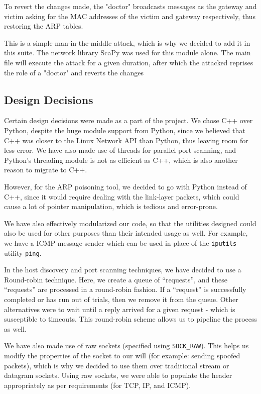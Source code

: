 \documentclass[12pt]{article}
\newcommand{\pbreak}{\vspace{4mm}}
\begin{document}
To revert the changes made, the "doctor" broadcasts messages as the gateway and victim asking for the MAC addresses of the victim and gateway respectively, thus restoring the ARP tables.
\pbreak

This is a simple man-in-the-middle attack, which is why we decided to add it in this suite. The network library ScaPy was used for this module alone. The main file will execute the attack for a given duration, after which the attacked reprises the role of a "doctor" and reverts the changes

\subsection{Design Decisions}
Certain design decisions were made as a part of the project. We chose C++ over Python, despite the huge module support from Python, since we believed that C++ was closer to the Linux Network API than Python, thus  leaving room for less error. We have also made use of threads for parallel port scanning, and Python's threading module is not as efficient as C++, which is also another reason to migrate to C++.
\pbreak

However, for the ARP poisoning tool, we decided to go with Python instead of C++, since it would require dealing with the link-layer packets, which could cause a lot of pointer manipulation, which is tedious and error-prone.
\pbreak

We have also effectively modularized our code, so that the utilities designed could also be used for other purposes than their intended usage as well. For example, we have a ICMP message sender which can be used in place of the \texttt{iputils} utility \texttt{ping}.
\pbreak

In the host discovery and port scanning techniques, we have decided to use a Round-robin technique. Here, we create a queue of ``requests'', and these ``requests'' are processed in a round-robin fashion. If a ``request'' is successfully completed or has run out of trials, then we remove it from the queue. Other alternatives were to wait until a reply arrived for a given request - which is susceptible to timeouts. This round-robin scheme allows us to pipeline the process as well.
\pbreak

We have also made use of raw sockets (specified using \texttt{SOCK\_RAW}). This helps us modify the properties of the socket to our will (for example: sending spoofed packets), which is why we decided to use them over traditional stream or datagram sockets. Using raw sockets, we were able to populate the header appropriately as per requirements (for TCP, IP, and ICMP).
\end{document}
